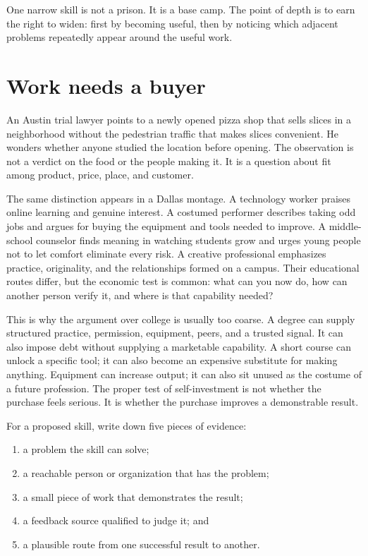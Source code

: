 One narrow skill is not a prison. It is a base camp. The point of depth is to
earn the right to widen: first by becoming useful, then by noticing which
adjacent problems repeatedly appear around the useful work.

\section{Work needs a buyer}

An Austin trial lawyer points to a newly opened pizza shop that sells slices in
a neighborhood without the pedestrian traffic that makes slices convenient.
He wonders whether anyone studied the location before opening. The observation
is not a verdict on the food or the people making it. It is a question about
fit among product, price, place, and customer.

The same distinction appears in a Dallas montage. A technology worker praises
online learning and genuine interest. A costumed performer describes taking
odd jobs and argues for buying the equipment and tools needed to improve. A
middle-school counselor finds meaning in watching students grow and urges
young people not to let comfort eliminate every risk. A creative professional
emphasizes practice, originality, and the relationships formed on a campus.
Their educational routes differ, but the economic test is common: what can you
now do, how can another person verify it, and where is that capability needed?

This is why the argument over college is usually too coarse. A degree can
supply structured practice, permission, equipment, peers, and a trusted signal.
It can also impose debt without supplying a marketable capability. A short
course can unlock a specific tool; it can also become an expensive substitute
for making anything. Equipment can increase output; it can also sit unused as
the costume of a future profession. The proper test of self-investment is not
whether the purchase feels serious. It is whether the purchase improves a
demonstrable result.

For a proposed skill, write down five pieces of evidence:

\begin{enumerate}
\item a problem the skill can solve;
\item a reachable person or organization that has the problem;
\item a small piece of work that demonstrates the result;
\item a feedback source qualified to judge it; and
\item a plausible route from one successful result to another.
\end{enumerate}

